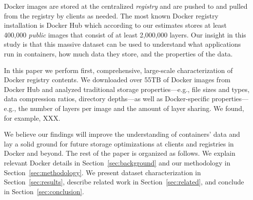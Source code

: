 Docker images are stored at the centralized \emph{registry} and are pushed to
and pulled from the registry by clients as needed. 
%
The most known Docker registry installation is Docker Hub which according to
our estimates stores at least 400,000 \emph{public} images that consist of at
least 2,000,000 layers.
%
Our insight in this study is that this massive dataset can be used to understand what
applications run in containers, how much data they store, and the properties of
the data.




In this paper we perform first, comprehensive, large-scale characterization of
Docker registry contents.
%
We downloaded over 55TB of Docker images from Docker Hub and analyzed
traditional storage properties---e.g., file sizes and types, data compression
ratios, directory depths---as well as Docker-specific properties---e.g., the number
of layers per image and the amount of layer sharing.
%
We found, for example, XXX.
%


We believe our findings will improve the understanding of containers' data and lay
a solid ground for future storage optimizations at clients and registries in
Docker and beyond. The rest of the paper is organized as follows. We explain
relevant Docker details in Section~\ref{sec:background} and our methodology in
Section~\ref{sec:methodology}. We present dataset characterization in
Section~\ref{sec:results}, describe related work in Section~\ref{sec:related},
and conclude in Section~\ref{sec:conclusion}.

